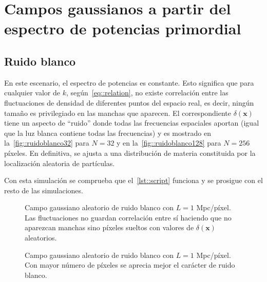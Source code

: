 \section{Campos gaussianos a partir del espectro de potencias primordial}
\subsection{Ruido blanco}
En este escenario, el espectro de potencias es constante. Esto significa que para cualquier valor de \(k\), según~\eqref{eq::relation}, no existe correlación entre las fluctuaciones de densidad de diferentes puntos del espacio real, es decir, ningún tamaño es privilegiado en las manchas que aparecen. El correspondiente \(\delta(\symbf{x})\) tiene un aspecto de ``ruido'' donde todas las frecuencias espaciales aportan (igual que la luz blanca contiene todas las frecuencias) y es mostrado en la~\autoref{fig::ruidoblanco32} para \(N=32\) y en la~\autoref{fig::ruidoblanco128} para \(N=256\) píxeles. En definitiva, se ajusta a una distribución de materia constituida por la localización aleatoria de partículas.

Con esta simulación se comprueba que el~\autoref{lst::script} funciona y se prosigue con el resto de las simulaciones.
\begin{figure}[ht]
    \centering
    \scalebox{.85}{}
    \caption[Ruido blanco \(N=32\) píxeles y \(L=1\) Mpc/píxel]{Campo gaussiano aleatorio de ruido blanco con \(L=1\) Mpc/píxel. Las fluctuaciones no guardan correlación entre sí haciendo que no aparezcan manchas sino píxeles sueltos con valores de \(\delta(\symbf{x})\) aleatorios.}
    \label{fig::ruidoblanco32}
\end{figure}
\begin{figure}[ht]
    \centering
    \scalebox{.85}{}
    \caption[Ruido blanco \(N=256\) píxeles y \(L=1\) Mpc/píxel]{Campo gaussiano aleatorio de ruido blanco con \(L=1\) Mpc/píxel. Con mayor número de píxeles se aprecia mejor el carácter de ruido blanco.}
    \label{fig::ruidoblanco128}
\end{figure}
\clearpage
